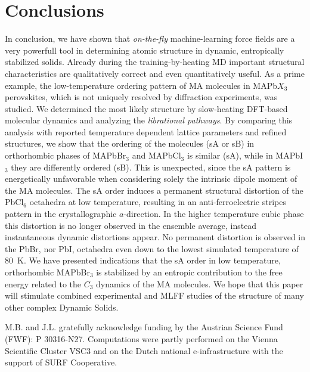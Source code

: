 \documentclass[journal=jpccck,manuscript=article,layout=twocolumn]{achemso}
\begin{document}
\section{Conclusions}

In conclusion, we have shown that \textit{on-the-fly} machine-learning force fields are a very powerfull tool in determining atomic structure in dynamic, entropically stabilized solids. Already during the training-by-heating MD important structural characteristics are qualitatively correct and even quantitatively useful. As a prime example, the low-temperature ordering pattern of MA molecules in MAPb$X_3$ perovskites, which is not uniquely resolved by diffraction experiments, was studied. We determined the most likely structure by slow-heating DFT-based molecular dynamics and analyzing the \textit{librational pathways}. By comparing this analysis with reported temperature dependent lattice parameters and refined structures, we show that the ordering of the molecules (sA or sB) in orthorhombic phases of MAPbBr$_3$ and MAPbCl$_3$ is similar (sA), while in MAPbI$_3$ they are differently ordered (sB). This is unexpected, since the sA pattern is energetically unfavorable when considering solely the intrinsic dipole moment of the MA molecules. The sA order induces a permanent structural distortion of the PbCl$_6$ octahedra at low temperature, resulting in an anti-ferroelectric stripes pattern in the crystallographic $a$-direction. In the higher temperature cubic phase this distortion is no longer observed in the ensemble average, instead instantaneous dynamic distortions appear. No permanent distortion is observed in the PbBr, nor PbI, octahedra even down to the lowest simulated temperature of 80~K. We have presented indications that the sA order in low temperature, orthorhombic MAPbBr$_3$ is stabilized by an entropic contribution to the free energy related to the $C_3$ dynamics of the MA molecules. We hope that this paper will stimulate combined experimental and MLFF studies of the structure of many other complex Dynamic Solids.


\begin{acknowledgement}
M.B. and J.L. gratefully acknowledge funding by the Austrian Science Fund (FWF): P 30316-N27. Computations were partly performed on the Vienna Scientific Cluster VSC3 and on the Dutch national e-infrastructure with the support of SURF Cooperative. 
\end{acknowledgement}
\end{document}
